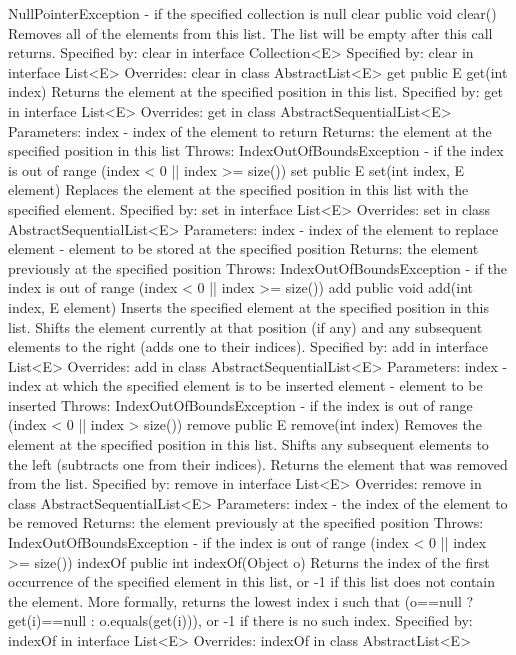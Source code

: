 \documentclass{book}
\begin{document}
NullPointerException - if the specified collection is null
clear
public void clear()
Removes all of the elements from this list. The list will be empty after this call returns.
Specified by:
clear in interface Collection<E>
Specified by:
clear in interface List<E>
Overrides:
clear in class AbstractList<E>
get
public E get(int index)
Returns the element at the specified position in this list.
Specified by:
get in interface List<E>
Overrides:
get in class AbstractSequentialList<E>
Parameters:
index - index of the element to return
Returns:
the element at the specified position in this list
Throws:
IndexOutOfBoundsException - if the index is out of range (index < 0 || index >= size())
set
public E set(int index,
E element)
Replaces the element at the specified position in this list with the specified element.
Specified by:
set in interface List<E>
Overrides:
set in class AbstractSequentialList<E>
Parameters:
index - index of the element to replace
element - element to be stored at the specified position
Returns:
the element previously at the specified position
Throws:
IndexOutOfBoundsException - if the index is out of range (index < 0 || index >= size())
add
public void add(int index,
E element)
Inserts the specified element at the specified position in this list. Shifts the element currently at that position (if any) and any subsequent elements to the right (adds one to their indices).
Specified by:
add in interface List<E>
Overrides:
add in class AbstractSequentialList<E>
Parameters:
index - index at which the specified element is to be inserted
element - element to be inserted
Throws:
IndexOutOfBoundsException - if the index is out of range (index < 0 || index > size())
remove
public E remove(int index)
Removes the element at the specified position in this list. Shifts any subsequent elements to the left (subtracts one from their indices). Returns the element that was removed from the list.
Specified by:
remove in interface List<E>
Overrides:
remove in class AbstractSequentialList<E>
Parameters:
index - the index of the element to be removed
Returns:
the element previously at the specified position
Throws:
IndexOutOfBoundsException - if the index is out of range (index < 0 || index >= size())
indexOf
public int indexOf(Object o)
Returns the index of the first occurrence of the specified element in this list, or -1 if this list does not contain the element. More formally, returns the lowest index i such that (o==null ? get(i)==null : o.equals(get(i))), or -1 if there is no such index.
Specified by:
indexOf in interface List<E>
Overrides:
indexOf in class AbstractList<E>
\end{document}

